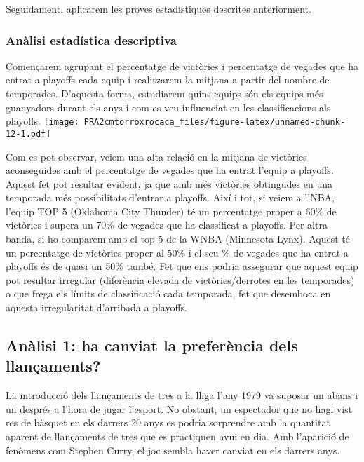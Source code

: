 \documentclass[
]{article}
\begin{document}
Seguidament, aplicarem les proves estadístiques descrites anteriorment.

\hypertarget{anuxe0lisi-estaduxedstica-descriptiva}{%
\subsubsection{Anàlisi estadística
descriptiva}\label{anuxe0lisi-estaduxedstica-descriptiva}}

Començarem agrupant el percentatge de victòries i percentatge de vegades
que ha entrat a playoffs cada equip i realitzarem la mitjana a partir
del nombre de temporades. D'aquesta forma, estudiarem quins equips són
els equips més guanyadors durant els anys i com es veu influenciat en
les classificacions als playoffs.
\texttt{[image: PRA2cmtorroxrocaca\_files/figure-latex/unnamed-chunk-12-1.pdf]}

Com es pot observar, veiem una alta relació en la mitjana de victòries
aconseguides amb el percentatge de vegades que ha entrat l'equip a
playoffs. Aquest fet pot resultar evident, ja que amb més victòries
obtingudes en una temporada més possibilitats d'entrar a playoffs. Així
i tot, si veiem a l'NBA, l'equip TOP 5 (Oklahoma City Thunder) té un
percentatge proper a 60\% de victòries i supera un 70\% de vegades que
ha classificat a playoffs. Per altra banda, si ho comparem amb el top 5
de la WNBA (Minnesota Lynx). Aquest té un percentatge de victòries
proper al 50\% i el seu \% de vegades que ha entrat a playoffs és de
quasi un 50\% també. Fet que ens podria assegurar que aquest equip pot
resultar irregular (diferència elevada de victòries/derrotes en les
temporades) o que frega els límits de classificació cada temporada, fet
que desemboca en aquesta irregularitat d'arribada a playoffs.

\hypertarget{anuxe0lisi-1-ha-canviat-la-preferuxe8ncia-dels-llanuxe7aments}{%
\subsection{Anàlisi 1: ha canviat la preferència dels
llançaments?}\label{anuxe0lisi-1-ha-canviat-la-preferuxe8ncia-dels-llanuxe7aments}}

La introducció dels llançaments de tres a la lliga l'any 1979 va suposar
un abans i un després a l'hora de jugar l'esport. No obstant, un
espectador que no hagi vist res de bàsquet en els darrers 20 anys es
podria sorprendre amb la quantitat aparent de llançaments de tres que es
practiquen avui en dia. Amb l'aparició de fenòmens com Stephen Curry, el
joc sembla haver canviat en els darrers anys.
\end{document}
